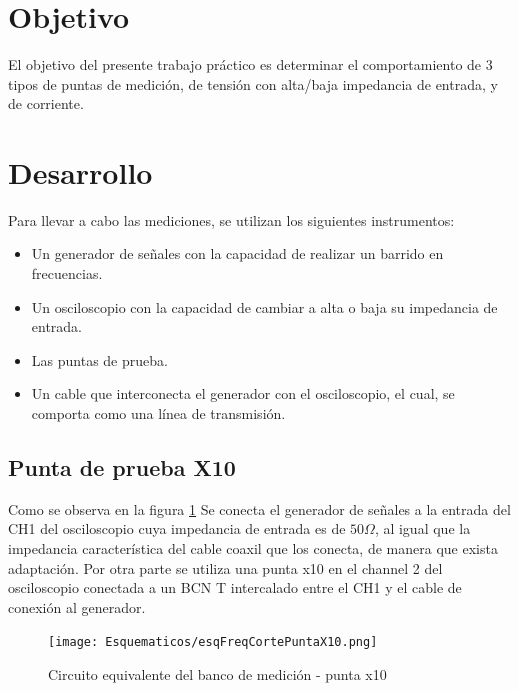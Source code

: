 \documentclass[a4paper,10pt]{article}
\title{  }
\begin{document}
	\maketitle %
	\newpage

	\tableofcontents %
	\newpage


	\section{Objetivo}
	
	\indent	El objetivo del presente trabajo práctico es determinar el 
	comportamiento de 3 tipos de puntas de medición, de tensión 
	con alta/baja impedancia de entrada, y de corriente.
	
	\newpage
	\section{Desarrollo}
		\indent Para llevar a cabo las mediciones, se utilizan los siguientes
		instrumentos:
		\begin{itemize}
			\item Un generador de señales con la capacidad de realizar un 
			barrido en frecuencias.
			\item Un osciloscopio con la capacidad de cambiar a alta o baja su
			impedancia de entrada.
			\item Las puntas de prueba.
			\item Un cable que interconecta el generador con el osciloscopio,
			el cual, se comporta como una línea de transmisión.
		\end{itemize}
				 
		\subsection{Punta de prueba X10}
		\indent Como se observa en la figura \ref{esq001} Se conecta el 
		generador de se\~nales a la entrada del CH1 del osciloscopio cuya 
		impedancia de entrada es de $50 \Omega$, al igual que la impedancia 
		caracter\'istica del cable coaxil que los conecta, de manera que 
		exista adaptaci\'on. Por otra parte se utiliza una punta x10 en el 
		channel 2 del osciloscopio conectada a un BCN T intercalado entre el 
		CH1 y el cable de conexión al generador. \\

		\begin{figure}[!htb]
			\centering
			\texttt{[image: Esquematicos/esqFreqCortePuntaX10.png]}
			\caption{Circuito equivalente del banco de medición - punta x10} 
			\label{esq001}
		\end{figure}
\end{document}
